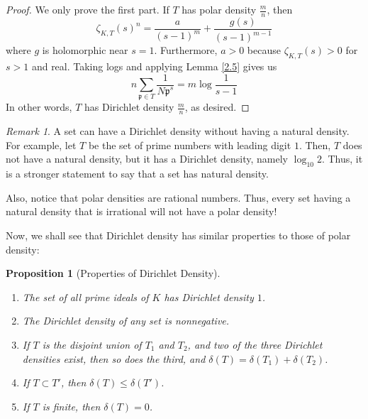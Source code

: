 \documentclass{article}
\theoremstyle{plain}
\newtheorem{prop}[thm]{Proposition}
\theoremstyle{definition}
\theoremstyle{remark}
\newtheorem{rem}[thm]{Remark}
\numberwithin{equation}{section}
\numberwithin{thm}{section}
\begin{document}
\begin{proof}
We only prove the first part. If $T$ has polar density $\frac{m}{n}$, then $$\zeta_{K, T}(s)^{n} = \frac{a}{(s-1)^{m}} + \frac{g(s)}{(s-1)^{m-1}}$$ where $g$ is holomorphic near $s = 1$. Furthermore, $a > 0$ because $\zeta_{K, T}(s) > 0$ for $s > 1$ and real. Taking logs and applying Lemma \ref{2.5} gives us $$n \sum_{\mathfrak{p} \in T} \frac{1}{N\mathfrak{p}^{s}} = m \log\frac{1}{s - 1}$$ In other words, $T$ has Dirichlet density $\frac{m}{n}$, as desired. 
\end{proof}

\begin{rem}
A set can have a Dirichlet density without having a natural density. For example, let $T$ be the set of prime numbers with leading digit $1$. Then, $T$ does not have a natural density, but it has a Dirichlet density, namely $\log_{10} 2$. Thus, it is a stronger statement to say that a set has natural density. 

Also, notice that polar densities are rational numbers. Thus, every set having a natural density that is irrational will not have a polar density!
\end{rem}

Now, we shall see that Dirichlet density has similar properties to those of polar density: 

\begin{prop}[Properties of Dirichlet Density] 

$ $ \\ \vspace{-0.5cm}



\begin{enumerate}

\item The set of all prime ideals of $K$ has Dirichlet density $1$. 

\item The Dirichlet density of any set is nonnegative.

\item If $T$ is the disjoint union of $T_1$ and $T_2$, and two of the three Dirichlet densities exist, then so does the third, and $\delta(T) = \delta(T_1) + \delta(T_2)$. 

\item If $T \subset T'$, then $\delta(T) \leq \delta(T')$. 

\item If $T$ is finite, then $\delta(T) = 0$.

\end{enumerate}

\end{prop}
\end{document}
